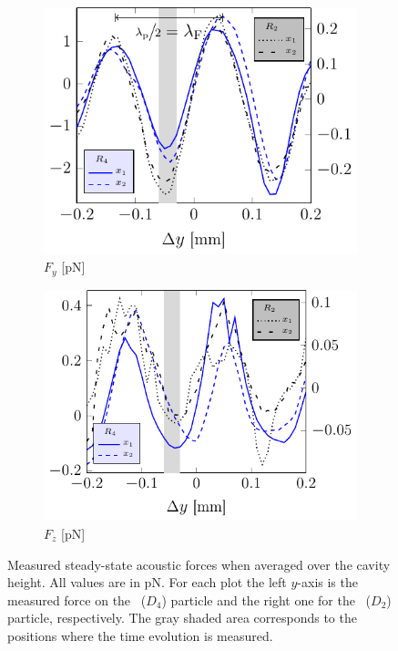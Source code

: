 \begin{figure}[H]
  \centering
  \begin{subfigure}{\figWidth}
    \centering
    \caption{$F_{y}$ [\si{\pico\newton}]}\label{subfig:TC-F_y}
    \includegraphics[]{Plots/cache/avgF_y_vs_dy.pdf}
  \end{subfigure}%
  \begin{subfigure}{\figWidth}
    \centering
    \caption{$F_{z}$ [\si{\pico\newton}]}\label{subfig:TC-F_z}
    \includegraphics[]{Plots/cache/avgF_z_vs_dy.pdf}
  \end{subfigure}%
  \caption{Measured steady-state acoustic forces when averaged over the cavity 
    height. All values are in \si{\pico\newton}. For each plot the left 
    $y$-axis is the measured force on the \Dfour~($D_{4}$) particle and the 
    right one for the \Dtwo~($D_{2}$) particle, respectively.
    The gray shaded area corresponds to the positions where the time evolution 
  is measured.}\label{fig:TC-averaged_forces_vs_dy}
\end{figure}

